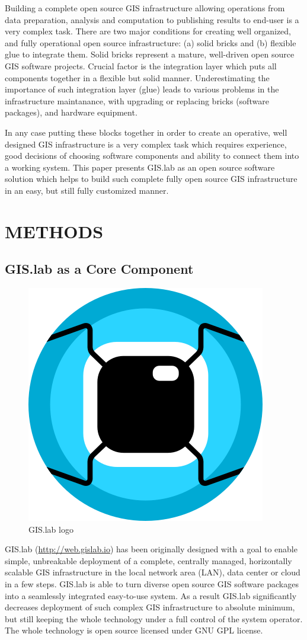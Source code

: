\documentclass{isprs}
\begin{document}
Building a complete open source GIS infrastructure allowing operations
from data preparation, analysis and computation to publishing results
to end-user is a very complex task. There are two major conditions for
creating well organized, and fully operational open source
infrastructure: (a) solid bricks and (b) flexible glue to integrate
them. Solid bricks represent a mature, well-driven open source GIS
software projects. Crucial factor is the integration layer which puts all components
together in a flexible but solid manner. Underestimating the
importance of such integration layer (glue) leads to various problems in the 
infrastructure maintanance, with upgrading or replacing bricks (software packages), and
hardware equipment.

In any case putting these blocks together in order to create an operative, well
designed GIS infrastructure is a very complex task which requires
experience, good decisions of choosing software components and ability
to connect them into a working system. This paper presents GIS.lab as
an open source software solution which helps to build such complete fully
open source GIS infrastructure in an easy, but still fully customized
manner.

\section{METHODS}

\subsection{GIS.lab as a Core Component}

\begin{figure}[ht!]
\begin{center}
  \includegraphics[width=.16\columnwidth]{figures/gislab-logo.png}
  \caption{GIS.lab logo}
\label{fig:gislab_logo}
\end{center}
\end{figure}

GIS.lab (\url{http://web.gislab.io}) has been originally designed with
a goal to enable simple, unbreakable deployment of a complete,
centrally managed, horizontally scalable GIS infrastructure in the
local network area (LAN), data center or cloud in a few steps. GIS.lab
is able to turn diverse open source GIS software packages into a
seamlessly integrated easy-to-use system. As a result GIS.lab
significantly decreases deployment of such complex GIS infrastructure
to absolute minimum, but still keeping the whole technology under a
full control of the system operator. The whole technology is open
source licensed under GNU GPL license.
\end{document}
